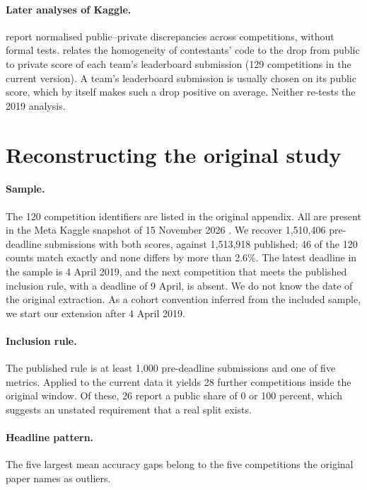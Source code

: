 \documentclass[10pt]{article}
\begin{document}
\paragraph{Later analyses of Kaggle.} \citet{bonisch2025chronicles} report normalised public--private discrepancies across competitions, without formal tests. \citet{burtch2026monoculture} relates the homogeneity of contestants' code to the drop from public to private score of each team's leaderboard submission (129 competitions in the current version). A team's leaderboard submission is usually chosen on its public score, which by itself makes such a drop positive on average. Neither re-tests the 2019 analysis.

\section{Reconstructing the original study}
\label{sec:recon}

\paragraph{Sample.} The 120 competition identifiers are listed in the original appendix. All are present in the Meta Kaggle snapshot of 15 November 2026 \citep{metakaggle}. We recover 1,510,406 pre-deadline submissions with both scores, against 1,513,918 published; 46 of the 120 counts match exactly and none differs by more than 2.6\%. The latest deadline in the sample is 4 April 2019, and the next competition that meets the published inclusion rule, with a deadline of 9 April, is absent. We do not know the date of the original extraction. As a cohort convention inferred from the included sample, we start our extension after 4 April 2019.

\paragraph{Inclusion rule.} The published rule is at least 1,000 pre-deadline submissions and one of five metrics. Applied to the current data it yields 28 further competitions inside the original window. Of these, 26 report a public share of 0 or 100 percent, which suggests an unstated requirement that a real split exists.

\paragraph{Headline pattern.} The five largest mean accuracy gaps belong to the five competitions the original paper names as outliers.
\end{document}
